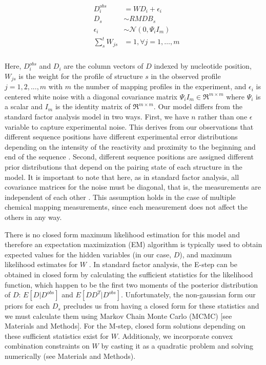 \documentclass[12pt]{article}
\begin{document}
\begin{align}
  &\begin{aligned}\label{reeffit_model}
    D^{obs}_{i} &= WD_{i} + \epsilon_{i}\\
    D_{s} &\sim RMDB_{s} \\
    \epsilon_{i} &\sim \mathcal{N}(0, \Psi_{i}I_{m}) \\
    \sum_{s}^{t} W_{js} &= 1, \forall j = 1, …, m\\
  \end{aligned}
\end{align}


Here, $D^{obs}_{i}$ and $D_{i}$ are the column vectors of $D$ indexed by nucleotide position, $W_{js}$ is the weight for the profile of structure $s$ in the observed profile $j = 1 , 2, ..., m$ with $m$ the number of mapping profiles in the experiment, and $\epsilon_{i}$ is centered white noise with a diagonal covariance matrix $\Psi_{i}I_{m} \in \Re^{m \times m}$ where $\Psi_{i}$ is a scalar and $I_{m}$ is the identity matrix of $\Re^{m \times m}$. 
Our model differs from the standard factor analysis model \cite{Ghahramani1996} in two ways. 
First, we have $n$ rather than one $\epsilon$ variable to capture experimental noise. 
This derives from our observations that different sequence positions have different experimental error distributions depending on the intensity of the reactivity and proximity to the beginning and end of the sequence \cite{Kladwang2011}. 
Second, different sequence positions are assigned different prior distributions that depend on the pairing state of each structure in the model. 
It is important to note that here, as in standard factor analysis, all covariance matrices for the noise must be diagonal, that is, the measurements are independent of each other \cite{Ghahramani1996,Rubin1982}. 
This assumption holds in the case of multiple chemical mapping measurements, since each measurement does not affect the others in any way.

There is no closed form maximum likelihood estimation for this model and therefore an expectation maximization (EM) algorithm is typically used to obtain expected values for the hidden variables (in our case, $D$), and maximum likelihood estimates for $W$ \cite{Ghahramani1996,Rubin1982}. 
In standard factor analysis, the E-step can be obtained in closed form by calculating the sufficient statistics for the likelihood function, which happen to be the first two moments of the posterior distribution of $D$: $E[D | D^{obs}]$ and $E[DD^T | D^{obs}]$. 
Unfortunately, the non-gaussian form our priors for each $D_{s}$ precludes us from having a closed form for these statistics and we must calculate them using Markov Chain Monte Carlo (MCMC) [see Materials and Methods]. 
For the M-step, closed form solutions depending on these sufficient statistics exist for $W$. 
Additionaly, we incorporate convex combination constraints on $W$ by casting it as a quadratic problem and solving numerically (see Materials and Methods).
\end{document}
